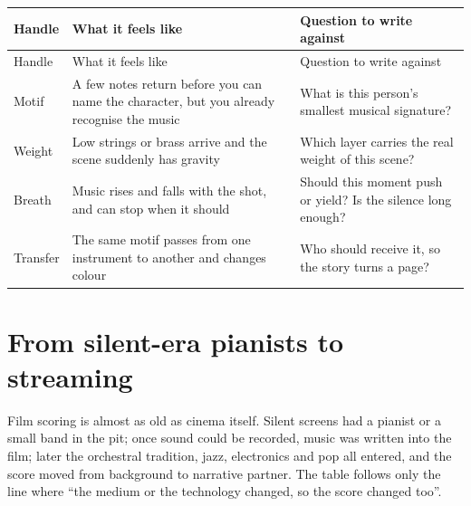 \begin{longtable}{p{}p{}p{}}
\toprule
Handle & What it feels like & Question to write against \\
\midrule
\endfirsthead
\toprule
Handle & What it feels like & Question to write against \\
\midrule
\endhead
Motif & A few notes return before you can name the character, but you already recognise the music & What is this person's smallest musical signature? \\
Weight & Low strings or brass arrive and the scene suddenly has gravity & Which layer carries the real weight of this scene? \\
Breath & Music rises and falls with the shot, and can stop when it should & Should this moment push or yield? Is the silence long enough? \\
Transfer & The same motif passes from one instrument to another and changes colour & Who should receive it, so the story turns a page? \\
\bottomrule
\end{longtable}

\section{From silent-era pianists to streaming}
\label{sec:film-history}

Film scoring is almost as old as cinema itself. Silent screens had a pianist or a small band in the pit; once sound could be recorded, music was written into the film; later the orchestral tradition, jazz, electronics and pop all entered, and the score moved from background to narrative partner. The table follows only the line where ``the medium or the technology changed, so the score changed too''.

